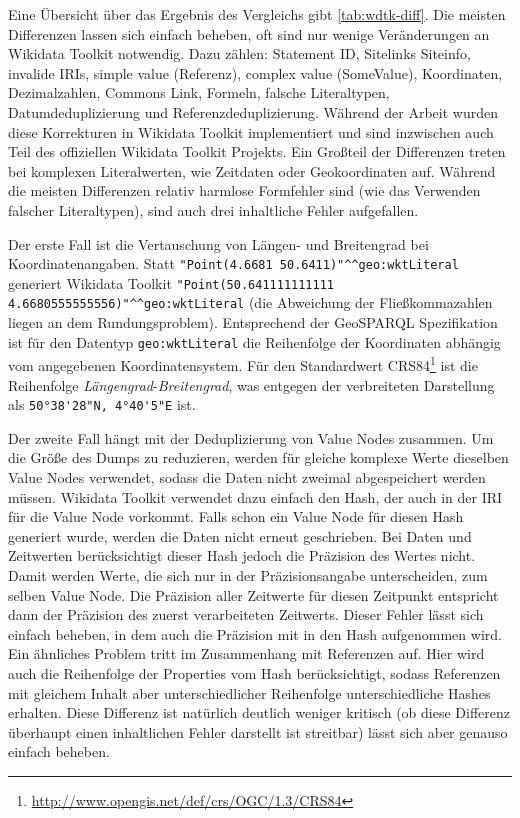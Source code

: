 Eine Übersicht über das Ergebnis des Vergleichs gibt \cref{tab:wdtk-diff}.
Die meisten Differenzen lassen sich einfach beheben, oft sind nur wenige Veränderungen an Wikidata Toolkit notwendig. Dazu zählen: Statement ID, Sitelinks Siteinfo, invalide IRIs, simple value (Referenz), complex value (SomeValue), Koordinaten, Dezimalzahlen, Commons Link, Formeln, falsche Literaltypen, Datumdeduplizierung und Referenzdeduplizierung.
Während der Arbeit wurden diese Korrekturen in Wikidata Toolkit implementiert und sind inzwischen auch Teil des offiziellen Wikidata Toolkit Projekts.
Ein Großteil der Differenzen treten bei komplexen Literalwerten, wie Zeitdaten oder Geokoordinaten auf.
Während die meisten Differenzen relativ harmlose Formfehler sind (wie das Verwenden falscher Literaltypen), sind auch drei inhaltliche Fehler aufgefallen.

Der erste Fall ist die Vertauschung von Längen- und Breitengrad bei Koordinatenangaben.
Statt \verb|"Point(4.6681 50.6411)"^^geo:wktLiteral| generiert Wikidata Toolkit \verb|"Point(50.641111111111 4.6680555555556)"^^geo:wktLiteral| (die Abweichung der Fließkommazahlen liegen an dem Rundungsproblem). Entsprechend der GeoSPARQL Spezifikation \cite{spec:geosparql} ist für den Datentyp \verb|geo:wktLiteral| die Reihenfolge der Koordinaten abhängig vom angegebenen Koordinatensystem.
Für den Standardwert CRS84\footnote{\url{http://www.opengis.net/def/crs/OGC/1.3/CRS84}} ist die Reihenfolge \emph{Längengrad}-\emph{Breitengrad}, was entgegen der verbreiteten Darstellung als \verb|50°38'28"N, 4°40'5"E| ist.

Der zweite Fall hängt mit der Deduplizierung von Value Nodes zusammen.
Um die Größe des Dumps zu reduzieren, werden für gleiche komplexe Werte dieselben Value Nodes verwendet, sodass die Daten nicht zweimal abgespeichert werden müssen.
Wikidata Toolkit verwendet dazu einfach den Hash, der auch in der IRI für die Value Node vorkommt.
Falls schon ein Value Node für diesen Hash generiert wurde, werden die Daten nicht erneut geschrieben.
Bei Daten und Zeitwerten berücksichtigt dieser Hash jedoch die Präzision des Wertes nicht.
Damit werden Werte, die sich nur in der Präzisionsangabe unterscheiden, zum selben Value Node.
Die Präzision aller Zeitwerte für diesen Zeitpunkt entspricht dann der Präzision des zuerst verarbeiteten Zeitwerts.
Dieser Fehler lässt sich einfach beheben, in dem auch die Präzision mit in den Hash aufgenommen wird.
Ein ähnliches Problem tritt im Zusammenhang mit Referenzen auf.
Hier wird auch die Reihenfolge der Properties vom Hash berücksichtigt, sodass Referenzen mit gleichem Inhalt aber unterschiedlicher Reihenfolge unterschiedliche Hashes erhalten.
Diese Differenz ist natürlich deutlich weniger kritisch (ob diese Differenz überhaupt einen inhaltlichen Fehler darstellt ist streitbar) lässt sich aber genauso einfach beheben.

